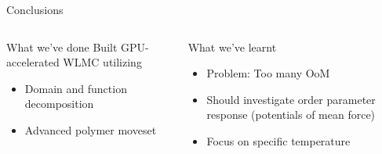 \documentclass[aspectratio=169]{beamer}
\begin{document}
\begin{frame}[c]{Conclusions}

  \begin{columns}[T, onlytextwidth]


    \centering
    \begin{block}{What we've done}
      Built GPU-accelerated WLMC utilizing
      \begin{itemize}
      \item Domain and function decomposition
      \item Advanced polymer moveset
    \end{itemize}
    \end{block}

    \begin{block}{What we've learnt}
      \begin{itemize}
        \item Problem: Too many OoM
        \item Should investigate order parameter response (potentials of mean force)
        \item Focus on specific temperature
      \end{itemize}
    \end{block}

    \vspace{4pt}
\end{columns}
\end{frame}
\end{document}
